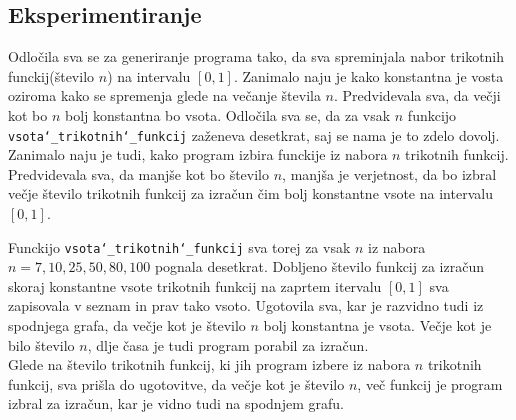 \documentclass[11pt]{article}
\theoremstyle{definition}
\newcommand{\1}{\mathbbm{1}}
\begin{document}
\subsection{Eksperimentiranje}
\vspace{0.5cm}

Odločila sva se za generiranje programa tako, da sva spreminjala nabor trikotnih funckij(število $n$) na intervalu $[0,1]$. Zanimalo naju je kako konstantna je vosta oziroma kako se spremenja glede na večanje števila $n$. Predvidevala sva, da večji kot bo $n$ bolj konstantna bo vsota. Odločila sva se, da za vsak $n$ funkcijo \texttt{vsota\char`_trikotnih\char`_funkcij} zaženeva desetkrat, saj se nama je to zdelo dovolj. 
Zanimalo naju je tudi, kako program izbira funckije iz nabora $n$ trikotnih funkcij. Predvidevala sva, da manjše kot bo število $n$, manjša je verjetnost, da bo izbral večje število trikotnih funkcij za izračun čim bolj konstantne vsote na intervalu $[0,1]$. \\
\vspace{0.25cm}

Funckijo \texttt{vsota\char`_trikotnih\char`_funkcij} sva torej za vsak $n$ iz nabora $n = {7, 10, 25, 50, 80, 100}$ pognala desetkrat. Dobljeno število funkcij za izračun skoraj konstantne vsote trikotnih funkcij na zaprtem itervalu $[0,1]$ sva zapisovala v seznam in prav tako vsoto. 
Ugotovila sva, kar je razvidno tudi iz spodnjega grafa, da večje kot je število $n$ bolj konstantna je vsota. Večje kot je bilo število $n$, dlje časa je tudi program porabil za izračun. \\

Glede na število trikotnih funkcij, ki jih program izbere iz nabora $n$ trikotnih funkcij, sva prišla do ugotovitve, da večje kot je število $n$, več funkcij je program izbral za izračun, kar je vidno tudi na spodnjem grafu. \\	
\end{document}
